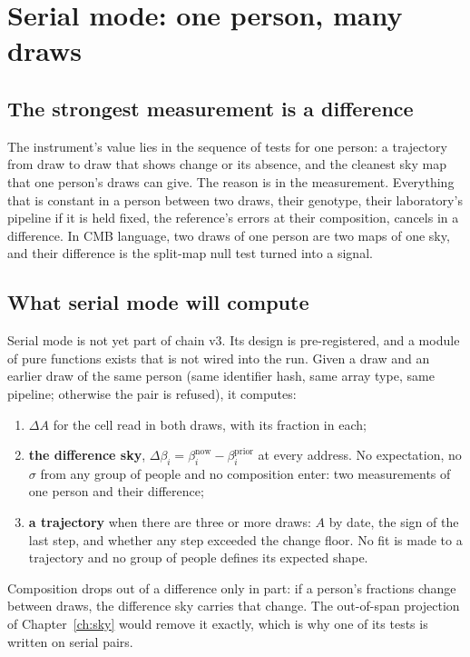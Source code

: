 \chapter{Serial mode: one person, many draws}\label{ch:serial}

\section{The strongest measurement is a difference}

The instrument's value lies in the sequence of tests for one person: a trajectory from draw to draw that shows change or its absence,
and the cleanest sky map that one person's draws can give. The reason is in the measurement. Everything that is constant in a person between two draws, their genotype, their laboratory's pipeline if it is
held fixed, the reference's errors at their composition, cancels in a difference. In CMB language, two draws of one person are two maps of one sky,
and their difference is the split-map null test turned into a signal.

\section{What serial mode will compute}

Serial mode is not yet part of chain v3. \openprob{} Its design is pre-registered, and a module of
pure functions exists that is not wired into the run. Given a draw and an earlier draw of the same person (same
identifier hash, same array type, same pipeline; otherwise the pair is refused), it computes:
\begin{enumerate}
\item \textbf{$\Delta A$} for the cell read in both draws, with its fraction in each;
\item \textbf{the difference sky}, $\Delta\beta_i=\beta_i^{\mathrm{now}}-\beta_i^{\mathrm{prior}}$ at every address. No expectation, no $\sigma$ from any
      group of people and no composition enter: two measurements of one person and their difference;
\item \textbf{a trajectory} when there are three or more draws: $A$ by date, the sign of the last step, and whether any step exceeded the change floor.
      No fit is made to a trajectory and no group of people defines its expected shape.
\end{enumerate}
Composition drops out of a difference only in part: if a person's fractions change between draws, the difference sky carries that change. The
out-of-span projection of Chapter~\ref{ch:sky} would remove it exactly, which is why one of its tests is written on serial pairs.

